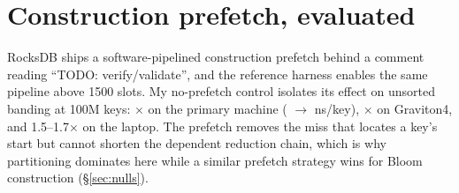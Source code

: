 \documentclass{article}
\begin{document}
\section{Construction prefetch, evaluated}\label{sec:prefetch}
RocksDB ships a software-pipelined construction prefetch behind a comment reading ``TODO: verify/validate'', and the reference harness enables the same pipeline above 1500 slots. My no-prefetch control isolates its effect on unsorted banding at 100M keys: \esevenprefetchgain$\times$ on the primary machine (\esevenbandnopf{} $\to$ \esevenbandref{} ns/key), \esevenprefetchgainarm$\times$ on Graviton4, and 1.5--1.7$\times$ on the laptop. The prefetch removes the miss that locates a key's start but cannot shorten the dependent reduction chain, which is why partitioning dominates here while a similar prefetch strategy wins for Bloom construction (\S\ref{sec:nulls}).
\end{document}
